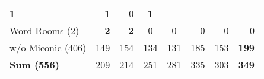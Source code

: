 \begin{tabular}{lrrccrrr}
    \textbf{1}                              & \textbf{1}                               & 0
                                            & \textbf{1}                                                                                                                                \\
    Word Rooms (2)                 & \textbf{2}                               &
    \textbf{2}                              & 0                                        & 0
                                            & 0                                        & 0                                      & 0                                                     \\
    \midrule
    w/o Miconic (406) & 149                                      & 154
                                            & 134                                      & 131
                                            & 185                                      & 153                                    &
    \textbf{199}                                                                                                                                                                        \\
    \textbf{Sum (556)}                      & 209                                      & 214
                                            & 251                                      & 281
                                            & 335                                      & 303                                    &
    \textbf{349}                                                                                                                                                                        \\
    \bottomrule
\end{tabular}
